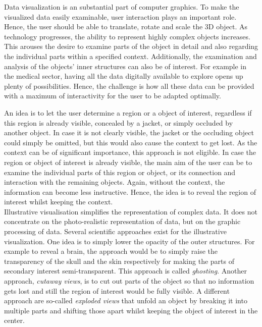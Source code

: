 

Data visualization is an substantial part of computer graphics. To make the visualized data easily examinable, user interaction plays an important role. Hence, the user should be able to translate, rotate and scale the 3D object. As technology progresses, the ability to represent highly complex objects increases. This arouses the desire to examine parts of the object in detail and also regarding the individual parts within a specified context. Additionally, the examination and analysis of the objects' inner structures can also be of interest. For example in the medical sector, having all the data digitally available to explore opens up plenty of possibilities. Hence, the challenge is how all these data can be provided with a maximum of interactivity for the user to be adapted optimally.

An idea is to let the user determine a region or a object of interest, regardless if this region is already visible, concealed by a jacket, or simply occluded by another object. In case it is not clearly visible, the jacket or the occluding object could simply be omitted, but this would also cause the context to get lost. As the context can be of significant importance, this approach is not eligible. In case the region or object of interest is already visible, the main aim of the user can be to examine the individual parts of this region or object, or its connection and interaction with the remaining objects. Again, without the context, the information can become less instructive. Hence, the idea is to reveal the region of interest whilst keeping the context.\\
Illustrative visualisation simplifies the representation of complex data. It does not concentrate on the photo-realistic representation of data, but on the graphic processing of data. Several scientific approaches exist for the illustrative visualization. One idea is to simply lower the opacity of the outer structures. For example to reveal a brain, the approach would be to simply raise the transparency of the skull and the skin respectively for making the parts of secondary interest semi-transparent. This approach is called \emph{ghosting}. Another approach, \emph{cutaway views}, is to cut out parts of the object so that no information gets lost and still the region of interest would be fully visible. A different approach are so-called \emph{exploded views} that unfold an object by breaking it into multiple parts and shifting those apart whilst keeping the object of interest in the center.


